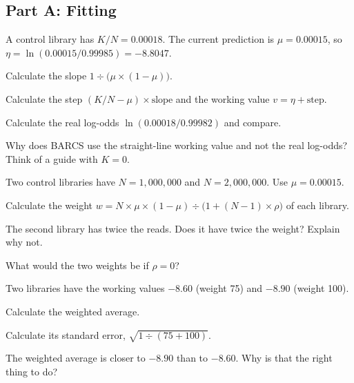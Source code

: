 \subsection*{Part A: Fitting}
\begin{exlist}[series=ex2]
\item \tagcalc{} \tagexplain{} A control library has $K/N = 0.00018$. The
current prediction is $\mu = 0.00015$, so $\eta = \ln(0.00015/0.99985) =
-8.8047$.
\begin{parts}
\item Calculate the slope $1 \div \bigl(\mu \times (1-\mu)\bigr)$.
\item Calculate the step $(K/N - \mu) \times \text{slope}$ and the working
  value $v = \eta + \text{step}$.
\item Calculate the real log-odds $\ln(0.00018/0.99982)$ and compare.
\item Why does BARCS use the straight-line working value and not the real
  log-odds? Think of a guide with $K = 0$.
\end{parts}

\item \tagcalc{} \tagexplain{} Two control libraries have $N = 1{,}000{,}000$
and $N = 2{,}000{,}000$. Use $\mu = 0.00015$.
\begin{parts}
\item Calculate the weight
  $w = N \times \mu \times (1-\mu) \div \bigl(1 + (N-1) \times \rho\bigr)$
  of each library.
\item The second library has twice the reads. Does it have twice the weight?
  Explain why not.
\item What would the two weights be if $\rho = 0$?
\end{parts}

\item \tagcalc{} \tagexplain{} Two libraries have the working values
$-8.60$ (weight 75) and $-8.90$ (weight 100).
\begin{parts}
\item Calculate the weighted average.
\item Calculate its standard error, $\sqrt{1 \div (75 + 100)}$.
\item The weighted average is closer to $-8.90$ than to $-8.60$. Why is
  that the right thing to do?
\end{parts}
\end{exlist}

